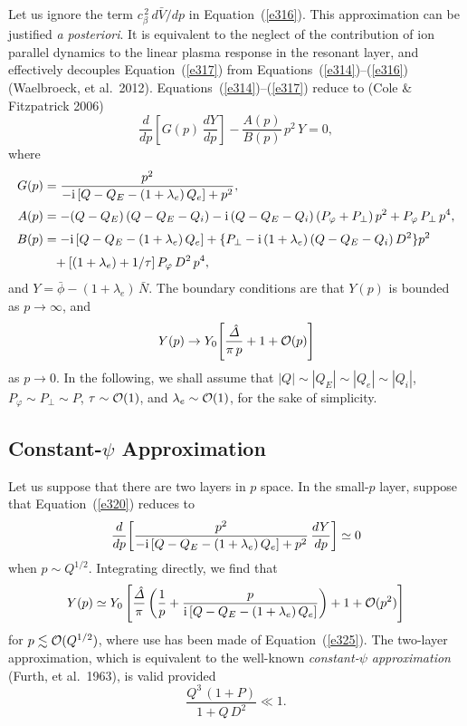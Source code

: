 \documentclass[notitlepage,12pt]{article}
\begin{document}
Let us ignore the term $c_\beta^{\,2}\,d\bar{V}/dp$ in Equation~(\ref{e316}). This approximation can
be justified {\em a posteriori}. It is equivalent to the neglect of the contribution of ion parallel dynamics to the linear  plasma
response in the resonant layer, and effectively decouples Equation~(\ref{e317}) from Equations~(\ref{e314})--(\ref{e316}) (Waelbroeck, et al.\ 2012). Equations~(\ref{e314})--(\ref{e317}) reduce to (Cole \& Fitzpatrick 2006)
\begin{equation}\label{e320}
\frac{d}{dp}\!\left[G(p)\,\frac{dY}{dp}\right] - \frac{A(p)}{B(p)}\,p^{2}\,Y = 0,
\end{equation}
where
\begin{align}
G(p)&= \frac{p^2}{-{\rm i}\,[Q-Q_E-(1+\lambda_e)\,Q_e] + p^2},\\[0.5ex]
 A(p) &= -(Q-Q_E)\,(Q-Q_E-Q_i)-{\rm i}\,(Q-Q_E-Q_i)\,(P_\varphi+P_\perp)\,p^2 + P_\varphi\,P_\perp\,p^4,\\[0.5ex]
 B(p) &= 
-{\rm i}\,[Q-Q_E-(1+\lambda_e)\,Q_e] +\{P_\perp - {\rm i}\,(1+\lambda_e)\,(Q-Q_E-Q_i)\,D^2\}p^2\nonumber\\[0.5ex]
&\phantom{=}+[(1+\lambda_e)+1/\tau]\,P_\varphi\,D^2\,p^4,
\end{align}
and $Y=\bar{\phi} - (1+\lambda_e)\,\bar{N}$. The boundary conditions are that $Y(p)$ is bounded as $p\rightarrow\infty$, and
\begin{equation}\label{e325}
Y(p)\rightarrow Y_0\!\left[\frac{\hat{\mit\Delta}}{\pi\,p} + 1+ {\cal O}(p)\right]
\end{equation}
as $p\rightarrow 0$. In the following, we shall assume that $|Q|\sim |Q_E|\sim |Q_e|\sim |Q_i|$, $P_\varphi\sim P_\perp \sim P$, $\tau\sim {\cal O}(1)$, and $\lambda_e\sim{\cal O}(1)$,  for the
sake of simplicity. 

\subsection{Constant-$\psi$ Approximation}\label{s5.6}
Let us suppose that there are two layers in $p$ space. In the small-$p$ layer, suppose that Equation~(\ref{e320}) reduces to
\begin{equation}
\frac{d}{dp}\!\left[\frac{p^2}{-{\rm i}\,[Q-Q_E-(1+\lambda_e)\,Q_e] + p^2}\,\frac{dY}{dp}\right]\simeq 0
\end{equation}
when $p\sim Q^{1/2}$. Integrating directly, we find that
\begin{equation}
Y(p) \simeq Y_0 \left[\frac{\hat{\mit\Delta}}{\pi}\left(\frac{1}{p} + \frac{p}{{\rm i}\,[Q-Q_E-(1+\lambda_e)\,Q_e]}\right) + 1 + {\cal O}(p^2)\right]
\end{equation}
for $p\lesssim {\cal O}(Q^{1/2})$, where use has been made of Equation~(\ref{e325}). The two-layer  approximation, which is
equivalent to the well-known {\em constant-$\psi$ approximation}\/ (Furth, et al.\ 1963), is valid provided
\begin{equation}
\frac{Q^3\,(1+P)}{1+Q\,D^2}\ll 1.
\end{equation}
\end{document}
